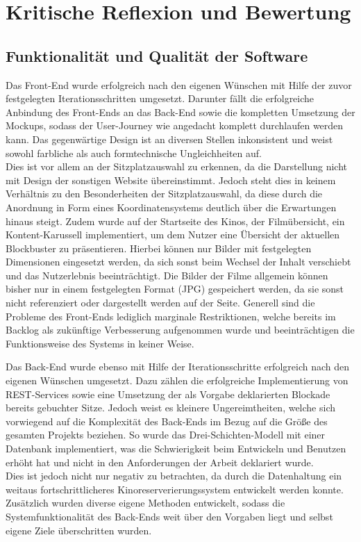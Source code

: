 \section{Kritische Reflexion und Bewertung}
\multipleauthorsection{\authorRF}{\authorEJ}

\subsection{Funktionalität und Qualität der Software}
\multipleauthorsection{\authorRF}{\authorEJ}

Das Front-End wurde erfolgreich nach den eigenen Wünschen mit Hilfe der zuvor festgelegten Iterationsschritten umgesetzt.
Darunter fällt die erfolgreiche Anbindung des Front-Ends an das Back-End sowie die kompletten Umsetzung der Mockups, sodass der User-Journey wie angedacht komplett durchlaufen werden kann.
Das gegenwärtige Design ist an diversen Stellen inkonsistent und weist sowohl farbliche als auch formtechnische Ungleichheiten auf. \\
Dies ist vor allem an der Sitzplatzauswahl zu erkennen, da die Darstellung nicht mit Design der sonstigen Website übereinstimmt.
Jedoch steht dies in keinem Verhältnis zu den Besonderheiten der Sitzplatzauswahl, da diese durch die Anordnung in Form eines Koordinatensystems deutlich über die Erwartungen hinaus steigt.
Zudem wurde auf der Startseite des Kinos, der Filmübersicht, ein Kontent-Karussell implementiert, um dem Nutzer eine Übersicht der aktuellen Blockbuster zu präsentieren.
Hierbei können nur Bilder mit festgelegten Dimensionen eingesetzt werden, da sich sonst beim Wechsel der Inhalt verschiebt und das Nutzerlebnis beeinträchtigt.
Die Bilder der Filme allgemein können bisher nur in einem festgelegten Format (JPG) gespeichert werden, da sie sonst nicht referenziert oder dargestellt werden auf der Seite.
Generell sind die Probleme des Front-Ends lediglich marginale Restriktionen, welche bereits im Backlog als zukünftige Verbesserung aufgenommen wurde und beeinträchtigen die Funktionsweise des Systems in keiner Weise.

Das Back-End wurde ebenso mit Hilfe der Iterationsschritte erfolgreich nach den eigenen Wünschen umgesetzt.
Dazu zählen die erfolgreiche Implementierung von \acs{REST}-Services sowie eine Umsetzung der als Vorgabe deklarierten Blockade bereits gebuchter Sitze.
Jedoch weist es kleinere Ungereimtheiten, welche sich vorwiegend auf die Komplexität des Back-Ends im Bezug auf die Größe des gesamten Projekts beziehen.
So wurde das Drei-Schichten-Modell mit einer Datenbank implementiert, was die Schwierigkeit beim Entwickeln und Benutzen erhöht hat und nicht in den Anforderungen der Arbeit deklariert wurde.\\
Dies ist jedoch nicht nur negativ zu betrachten, da durch die Datenhaltung ein weitaus fortschrittlicheres Kinoreserverierungssystem entwickelt werden konnte.
Zusätzlich wurden diverse eigene Methoden entwickelt, sodass die Systemfunktionalität des Back-Ends weit über den Vorgaben liegt und selbst eigene Ziele überschritten wurden.

